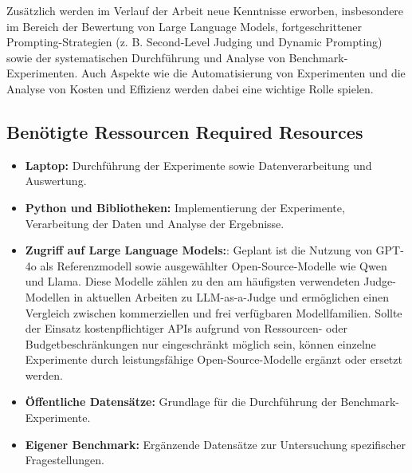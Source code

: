 \documentclass[ngerman]{rwureport}
\begin{document}
{{{{{		Zusätzlich werden im Verlauf der Arbeit neue Kenntnisse erworben, insbesondere im Bereich der Bewertung von Large Language Models, fortgeschrittener Prompting-Strategien (z. B. Second-Level Judging und Dynamic Prompting) sowie der systematischen Durchführung und Analyse von Benchmark-Experimenten. Auch Aspekte wie die Automatisierung von Experimenten und die Analyse von Kosten und Effizienz werden dabei eine wichtige Rolle spielen.}


\subsection{
    {Benötigte Ressourcen}
    {Required Resources}}
\label{sub:resources}


{
		
		\begin{itemize}
			\item \textbf{Laptop:} Durchführung der Experimente sowie Datenverarbeitung und Auswertung.
			
			\item \textbf{Python und Bibliotheken:} Implementierung der Experimente, Verarbeitung der Daten und Analyse der Ergebnisse.
			
			\item \textbf{Zugriff auf Large Language Models:}: Geplant ist die Nutzung von GPT-4o als Referenzmodell sowie ausgewählter Open-Source-Modelle wie Qwen und Llama. Diese Modelle zählen zu den am häufigsten verwendeten Judge-Modellen in aktuellen Arbeiten zu LLM-as-a-Judge \cite{gu2026surveyjudge} und ermöglichen einen Vergleich zwischen kommerziellen und frei verfügbaren Modellfamilien. Sollte der Einsatz kostenpflichtiger APIs aufgrund von Ressourcen- oder Budgetbeschränkungen nur eingeschränkt möglich sein, können einzelne Experimente durch leistungsfähige Open-Source-Modelle ergänzt oder ersetzt werden.
			
			\item \textbf{Öffentliche Datensätze:} Grundlage für die Durchführung der Benchmark-Experimente.
			
			\item \textbf{Eigener Benchmark:} Ergänzende Datensätze zur Untersuchung spezifischer Fragestellungen.
			

\end{itemize}}}}}}
\end{document}
